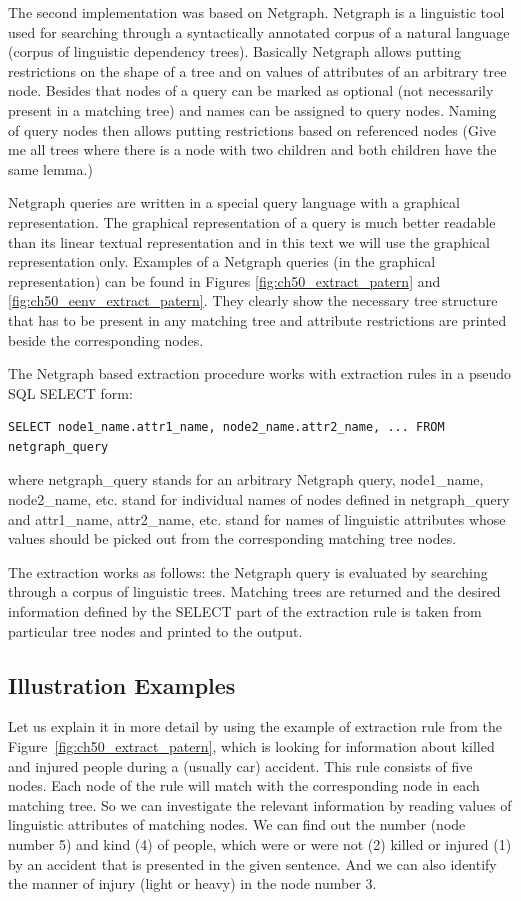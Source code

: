 The second implementation was based on Netgraph. Netgraph is a linguistic tool used for searching through a syntactically annotated corpus of a natural language (corpus of linguistic dependency trees). Basically Netgraph allows putting restrictions on the shape of a tree and on values of attributes of an arbitrary tree node. Besides that nodes of a query can be marked as optional (not necessarily present in a matching tree) and names can be assigned to query nodes. Naming of query nodes then allows putting restrictions based on referenced nodes (Give me all trees where there is a node with two children and both children have the same lemma.)

Netgraph queries are written in a special query language with a graphical representation. The graphical representation of a query is much better readable than its linear textual representation and in this text we will use the graphical representation only. Examples of a Netgraph queries (in the graphical representation) can be found in Figures \ref{fig:ch50_extract_patern} and \ref{fig:ch50_eenv_extract_patern}. They clearly show the necessary tree structure that has to be present in any matching tree and attribute restrictions are printed beside the corresponding nodes.

The Netgraph based extraction procedure works with extraction rules in a pseudo SQL SELECT form:

\begin{verbatim}
SELECT node1_name.attr1_name, node2_name.attr2_name, ... FROM netgraph_query
\end{verbatim}

where netgraph\_query stands for an arbitrary Netgraph query, node1\_name, node2\_name, etc. stand for individual names of nodes defined in netgraph\_query and attr1\_name, attr2\_name, etc. stand for names of linguistic attributes whose values should be picked out from the corresponding matching tree nodes.

The extraction works as follows: the Netgraph query is evaluated by searching through a corpus of linguistic trees. Matching trees are returned and the desired information defined by the SELECT part of the extraction rule is taken from particular tree nodes and printed to the output.

\subsection{Illustration Examples}

Let us explain it in more detail by using the example of extraction rule from the Figure~\ref{fig:ch50_extract_patern}, which is looking for information about killed and injured people during a (usually car) accident. This rule consists of five nodes. Each node of the rule will match with the corresponding node in each matching tree. So we can investigate the relevant information by reading values of linguistic attributes of matching nodes. We can find out the number (node number 5) and kind (4) of people, which were or were not (2) killed or injured (1) by an accident that is presented in the given sentence. And we can also identify the manner of injury (light or heavy) in the node number 3.

